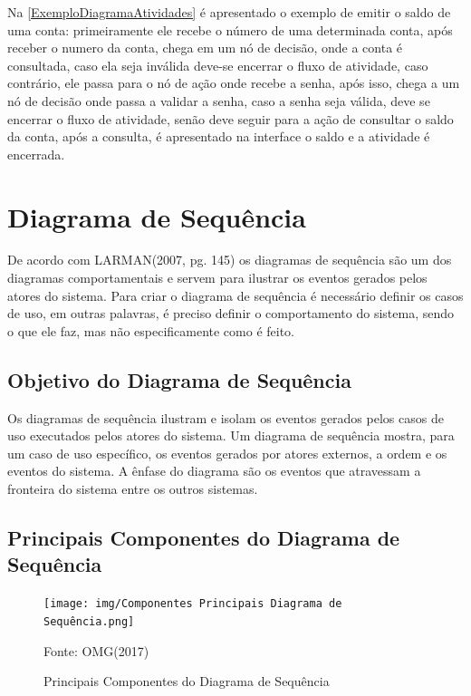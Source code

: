 \documentclass[12pt,openright,oneside,a4paper,
	chapter=TITLE,
	section=TITLE,
	english,brazil]{abntex2}
\begin{document}
Na \autoref{ExemploDiagramaAtividades} é apresentado o exemplo de emitir o saldo de uma conta: primeiramente ele recebe o número de uma determinada conta, após receber o numero da conta, chega em um nó de decisão, onde a conta é consultada, caso ela seja inválida deve-se encerrar o fluxo de atividade, caso contrário, ele passa para o nó de ação onde recebe a senha, após isso, chega a um nó de decisão onde passa a validar a senha, caso a senha seja válida, deve se encerrar o fluxo de atividade, senão deve seguir para a ação de consultar o saldo da conta, após a consulta, é apresentado na interface o saldo e a atividade é encerrada.

\chapter{Diagrama de Sequência}

De acordo com LARMAN(2007, pg. 145) os diagramas de sequência são um dos diagramas comportamentais e servem para ilustrar os eventos gerados pelos atores do sistema. Para criar o diagrama de sequência é necessário definir os casos de uso, em outras palavras, é preciso definir o comportamento do sistema, sendo o que ele faz, mas não especificamente como é feito.

\section{Objetivo do Diagrama de Sequência}

Os diagramas de sequência ilustram e isolam os eventos gerados pelos casos de uso executados pelos atores do sistema. Um diagrama de sequência mostra, para um caso de uso específico, os eventos gerados por atores externos, a ordem e os eventos do sistema. A ênfase do diagrama são os eventos que atravessam a fronteira do sistema entre os outros sistemas.

\section{Principais Componentes do Diagrama de Sequência}

\begin{figure}[!htp]
	\caption{Principais Componentes do Diagrama de Sequência}
	\centering
	\texttt{[image: img/Componentes Principais Diagrama de Sequência.png]}
	\\

	\footnotesize\raggedright Fonte: OMG(2017)
\end{figure}
\end{document}
